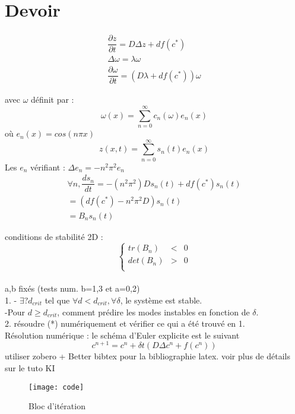 \documentclass[12pt,a4paper]{article}
\begin{document}
\section{Devoir}
\begin{align*}
\dfrac{\partial z}{\partial t}= D \Delta z + df(c^*) \\
\Delta \omega=\lambda \omega \\
\dfrac{\partial \omega}{\partial t}= (D \lambda + df(c^*))\omega
\end{align*}

avec $\omega$ définit par : 
\begin{equation}
\omega (x) = \sum_{n=0}^{\infty} c_{n}(\omega)e_{n}(x)
\end{equation}
où $e_{n}(x)=cos(n \pi x)$
\begin{equation}
z(x,t)= \sum_{n=0}^{\infty} s_{n}(t) e_{n}(x)
\end{equation}
Les $e_n$ vérifiant : $\Delta e_n = -n^2 \pi ^2 e_n$
\begin{align*}
\forall n, \dfrac{d s_n}{dt}= -(n^2 \pi^2) D s_n (t) + df(c^*)s_n (t) \\
=(df(c^*) - n^2 \pi ^2 D)s_n (t)\\
=B_n s_n (t)
\end{align*}

conditions de stabilité 2D : 
\[\left
\{\begin{array}{rcr}tr(B_n) & < & 0 \\
det(B_n) & > & 0 \\
\end{array}
\right.\]\\



a,b fixés (tests num. b=1,3 et a=0,2)\\

1.  - $\exists ? d_{crit}$ tel que $\forall d<d_{crit}, \forall\delta$, le système est stable.\\
-Pour $d \geq  d_{crit}$, comment prédire les modes instables en fonction de $\delta$.\\

2. résoudre (*) numériquement et vérifier ce qui a été trouvé en 1.\\


Résolution numérique : le schéma d'Euler explicite est le suivant
\begin{equation}
c^{n+1}=c^n+ \delta t ( D \Delta c^n + f(c^n))
\end{equation}
utiliser zobero + Better bibtex pour la bibliographie latex. voir plus de détails sur le tuto KI






\begin{figure}[h]
\centering
\texttt{[image: code]}
\caption{Bloc d'itération 
         \label{fig:exemple}}
\end{figure}
\end{document}
